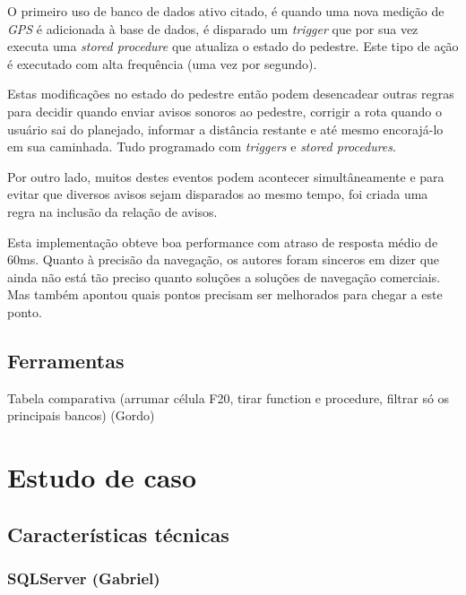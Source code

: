 \documentclass[conference]{IEEEtran}
\begin{document}
    O primeiro uso de banco de dados ativo citado, é quando uma nova medição de \textit{GPS} é adicionada à base de dados, é disparado um \textit{trigger} que por sua vez executa uma \textit{stored procedure} que atualiza o estado do pedestre. Este tipo de ação é executado com alta frequência (uma vez por segundo).

    Estas modificações no estado do pedestre então podem desencadear outras regras para decidir quando enviar avisos sonoros ao pedestre, corrigir a rota quando o usuário sai do planejado, informar a distância restante e até mesmo encorajá-lo em sua caminhada. Tudo programado com \textit{triggers} e \textit{stored procedures}.

    Por outro lado, muitos destes eventos podem acontecer simultâneamente e para evitar que diversos avisos sejam disparados ao mesmo tempo, foi criada uma regra na inclusão da relação de avisos.

    Esta implementação obteve boa performance com atraso de resposta médio de 60ms. Quanto à precisão da navegação, os autores foram sinceros em dizer que ainda não está tão preciso quanto soluções a soluções de navegação comerciais. Mas também apontou quais pontos precisam ser melhorados para chegar a este ponto.

  \subsection{Ferramentas}
  Tabela comparativa (arrumar célula F20, tirar function e procedure, filtrar só os principais bancos) (Gordo)

\section{Estudo de caso}
  \subsection{Características técnicas}
    \subsubsection{SQLServer (Gabriel)}
\end{document}
